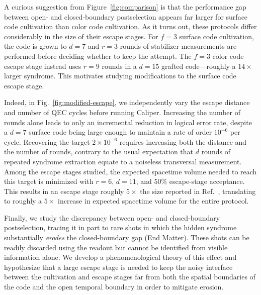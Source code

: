 \documentclass[
    reprint,
    amsmath,amssymb,
    nofootinbib,
    superscriptaddress,
    aps,
    noeprint,
    longbibliography,
    prl
]{revtex4-2}
\theoremstyle{plain}
\begin{document}
A curious suggestion from Figure~\ref{fig:comparison} is that the performance gap between open- and closed-boundary postselection appears far larger for surface code cultivation than color code cultivation. As it turns out,
these protocols differ considerably in the size of their escape stages. For $f=3$ surface code
cultivation, the code is grown to $d=7$ and $r=3$ rounds of stabilizer measurements are performed
before deciding whether to keep the attempt. The $f=3$ color code escape stage instead uses $r=9$
rounds in a $d=15$ grafted code---roughly a $14\times$ larger syndrome. This motivates studying
modifications to the surface code escape stage.

Indeed, in Fig.~\ref{fig:modified-escape}, we independently vary the escape distance and number of QEC
cycles before running Caliper. Increasing the number of rounds alone leads to only an incremental
reduction in logical error rate, despite a $d=7$ surface code being large enough to maintain a rate
of order $10^{-6}$ per cycle. 
Recovering the target \(2\times10^{-6}\) requires increasing both the distance and the number of rounds, contrary to the usual expectation that \(d\) rounds of repeated syndrome extraction equate to a noiseless transversal measurement. Among the escape stages studied, the expected spacetime volume needed to reach this target is
minimized with $r=6$, $d=11$, and $50\%$ escape-stage acceptance. This results in an escape stage roughly
$5\times$ the size reported in Ref.~\cite{sahay2026fold}, translating to roughly a $5\times$
increase in expected spacetime volume for the entire protocol.

Finally, we study the discrepancy between open- and closed-boundary postselection, tracing it in part to rare shots in which the hidden syndrome substantially \textit{erodes} the closed-boundary gap (End Matter). These shots can be readily discarded using the readout but cannot be identified from visible information alone. We develop a phenomenological theory of this effect and hypothesize that a large escape stage is needed to keep the noisy interface between the cultivation and escape stages far from both the spatial boundaries of the code and the open temporal boundary in order to mitigate erosion. 
\end{document}
